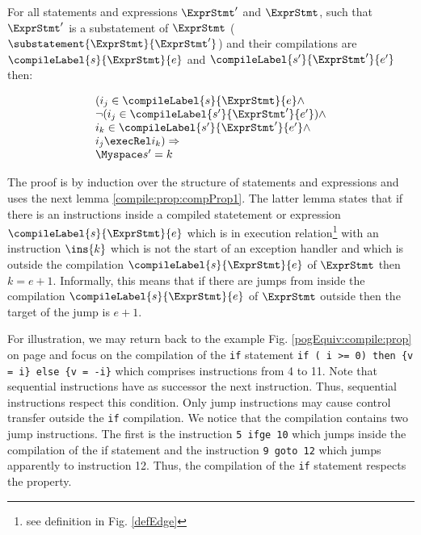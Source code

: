 \begin{compPropApp}\label{compile:prop:compProp2}
 For all  statements and expressions $\ExprStmt'$  and $\ExprStmt$, such that $\ExprStmt'$  is a substatement of $\ExprStmt$ ($\substatement{\ExprStmt }{\ExprStmt'}$)
and their  compilations  are $\compileLabel{s}{\ExprStmt}{e}$ and  $\compileLabel{s'}{\ExprStmt'}{e'}$  then:



$$\begin{array}{l} 
                        (  i_j \in \compileLabel{s}{\ExprStmt}{e} \wedge\\
		        \neg (i_j \in \compileLabel{s'}{\ExprStmt'}{e'} )   \wedge \\
		        i_k \in \compileLabel{s'}{\ExprStmt'}{e'}  \wedge \\
		        
		       i_j \execRel i_k )  \Rightarrow \\ 
		       \Myspace  s' = k 


  \end{array}$$ 

\end{compPropApp}
The proof is by induction over the structure of statements and expressions  and uses the next lemma \ref{compile:prop:compProp1}.
The latter lemma  states  that  if there is an instructions inside a compiled statetement or expression 
 $\compileLabel{s}{\ExprStmt}{e}$ which   is in execution relation\footnote{see definition in Fig. \ref{defEdge}}  with an instruction 
$\ins{k}$ which is not the start of an exception handler and which is outside the compilation $\compileLabel{s}{\ExprStmt }{e}$
of $\ExprStmt$  then   $ k  = e +1$. Informally,  this means that if there are jumps from inside the compilation  $\compileLabel{s}{\ExprStmt}{e}$  of $\ExprStmt$   
outside then the target of the jump is $e +1$.

For illustration, we may return back to the example Fig. \ref{pogEquiv:compile:prop}  on page \pageref{pogEquiv:compile:prop} and focus on the 
compilation of the \lstinline!if!  statement   
\lstinline!if ( i >= 0) then {v = i} else {v = -i}! 
which comprises instructions from 4 to 11. Note that sequential instructions   have as  successor the next instruction.  Thus, sequential
instructions respect this condition. 
Only jump instructions may cause control transfer outside the \lstinline!if! compilation. 
We notice that the compilation contains two jump instructions. 
The first is the instruction \lstinline!5 ifge 10! which jumps inside the compilation of the if statement
and the instruction \lstinline!9 goto 12!  which jumps apparently to instruction 12. 
Thus, the compilation of the \lstinline!if! statement respects the property.

